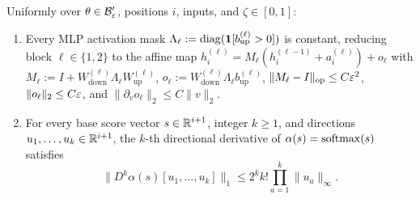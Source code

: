 \begin{lemma}
\label{lem:frozen-relu-zeta}
Uniformly over $\theta \in \mathcal B_{\varepsilon}'$, positions $i$, inputs, and $\zeta \in [0,1]$:
\begin{enumerate}[label=(\alph*),leftmargin=*]
  \item Every MLP activation mask $\Lambda_\ell := \operatorname{diag}(\mathbf 1[b_{\mathrm{up}}^{(\ell)} > 0])$ is constant, reducing block $\ell \in \{1,2\}$ to the affine map $h_i^{(\ell)} = M_\ell(h_i^{(\ell-1)} + a_i^{(\ell)}) + o_\ell$ with $M_\ell := I + W_{\mathrm{down}}^{(\ell)}\Lambda_\ell W_{\mathrm{up}}^{(\ell)}$, $o_\ell := W_{\mathrm{down}}^{(\ell)}\Lambda_\ell b_{\mathrm{up}}^{(\ell)}$, $\|M_\ell - I\|_{\mathrm{op}} \le C\varepsilon^2$, $\|o_\ell\|_2 \le C\varepsilon$, and $\|\partial_v o_\ell\|_2 \le C\|v\|_2$.
  \item For every base score vector $s \in \mathbb R^{i+1}$, integer $k \ge 1$, and directions $u_1, \ldots, u_k \in \mathbb R^{i+1}$, the $k$-th directional derivative of $\alpha(s) = \operatorname{softmax}(s)$ satisfies
  \begin{equation}
    \bigl\|D^k\alpha(s)[u_1, \ldots, u_k]\bigr\|_1 \le 2^k k!\prod_{a=1}^k \|u_a\|_\infty.
    \label{eq:softmax-avg}
  \end{equation}
\end{enumerate}
\end{lemma}
